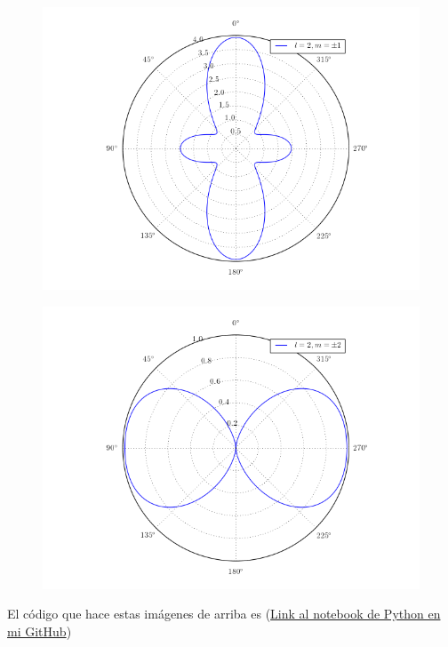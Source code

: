 \documentclass[a4paper,11pt]{article}
\numberwithin{equation}{section}
\begin{document}
\begin{figure}[H]
 \center
 \includegraphics[scale=0.6]{problema3fig5}
\end{figure}

\begin{figure}[H]
 \center
 \includegraphics[scale=0.6]{problema3fig6}
\end{figure}

El código que hace estas imágenes de arriba es 
(\href{https://github.com/FavioVazquez/Electrodinamica-Clasica-PCF/blob/master/Tarea9/Problema3.ipynb}{Link al 
notebook de Python en mi GitHub})
\end{document}
